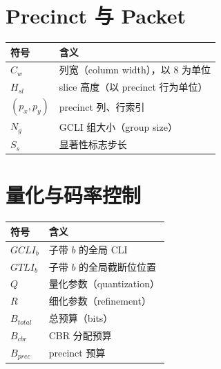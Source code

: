 \section{Precinct 与 Packet}

\begin{tabular}{@{}ll@{}}
\toprule
符号 & 含义 \\
\midrule
$C_w$ & 列宽（column width），以 8 为单位 \\
$H_{sl}$ & slice 高度（以 precinct 行为单位） \\
$(p_x, p_y)$ & precinct 列、行索引 \\
$N_g$ & GCLI 组大小（group size） \\
$S_s$ & 显著性标志步长 \\
\bottomrule
\end{tabular}

\section{量化与码率控制}

\begin{tabular}{@{}ll@{}}
\toprule
符号 & 含义 \\
\midrule
$GCLI_b$ & 子带 $b$ 的全局 CLI \\
$GTLI_b$ & 子带 $b$ 的全局截断位位置 \\
$Q$ & 量化参数（quantization） \\
$R$ & 细化参数（refinement） \\
$B_{total}$ & 总预算（bits） \\
$B_{cbr}$ & CBR 分配预算 \\
$B_{prec}$ & precinct 预算 \\
\bottomrule
\end{tabular}
